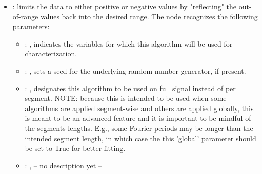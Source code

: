 \begin{itemize}
    \item {}:
      limits the data to either positive or negative values by "reflecting" the
      out-of-range values back into the desired range.
      The  node recognizes the following parameters:
        \begin{itemize}
          \item {}: ,
            indicates the variables for which this algorithm will be used for characterization.
          \item {}: ,
            sets a seed for the underlying random number generator, if present.
          \item {}: ,
            designates this algorithm to be used on full signal instead of per
            segment. NOTE: because this is intended to be used when some algorithms are
            applied segment-wise and others are applied globally, this is meant to be an
            advanced feature and it is important to be mindful of the segments lengths.
            E.g., some Fourier periods may be longer than the intended segment length, in
            which case the this 'global' parameter should be set to True for better
            fitting. 
          \item {}: ,
            -- no description yet --
      \end{itemize}


\end{itemize}
